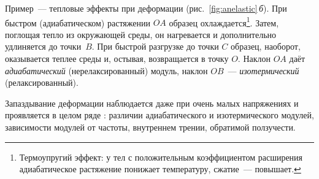Пример~— тепловые эффекты при деформации
(рис.~\ref{fig:anelastic}\,\textit{б}). При быстром (адиабатическом)
растяжении $OA$ образец охлаждается\footnote{Термоупругий эффект: у тел с
положительным коэффициентом расширения адиабатическое растяжение
понижает температуру, сжатие~— повышает.}. Затем, поглощая тепло из
окружающей среды, он нагревается и дополнительно удлиняется до точки~$B$.
При быстрой разгрузке до точки $C$ образец, наоборот, оказывается теплее
среды и, остывая, возвращается в точку $O$. Наклон $OA$ даёт
\emph{адиабатический} (нерелаксированный) модуль, наклон $OB$~—
\emph{изотермический} (релаксированный).

Запаздывание деформации наблюдается даже при очень малых напряжениях и
проявляется в целом ряде : различии
адиабатического и изотермического модулей, зависимости модулей от
частоты, внутреннем трении, обратимой ползучести.

